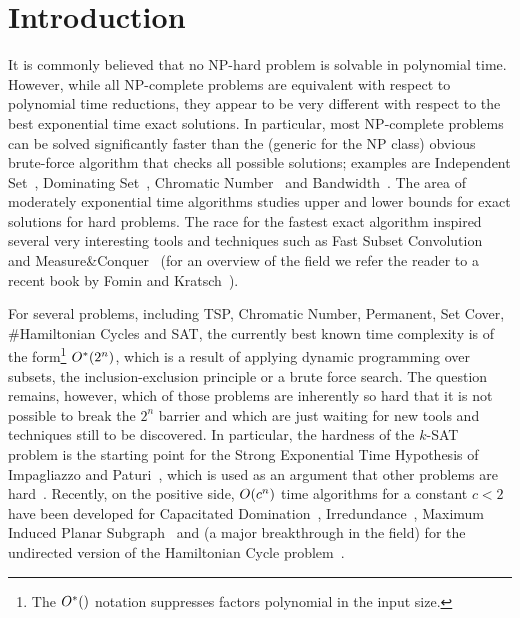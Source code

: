 \documentclass{article}
\theoremstyle{definition}
\begin{document}
\section{Introduction}

It is commonly believed that no NP-hard problem is solvable in polynomial time.
However, while all NP-complete problems are equivalent with respect to polynomial time reductions,
they appear to be very different with respect to the best exponential time exact solutions.
In particular, most NP-complete problems can be solved significantly faster than
the (generic for the NP class) obvious brute-force algorithm that checks all possible solutions;
examples are {\sc Independent Set}~\cite{fgk:m-c-jacm}, {\sc Dominating Set}~\cite{fgk:m-c-jacm,rooij:domsetesa09}, {\sc Chromatic Number}~\cite{bjohus:color} and
{\sc Bandwidth}~\cite{nasz-tcs}.
The area of moderately exponential time algorithms studies upper and lower bounds
for exact solutions for hard problems.
The race for the fastest exact algorithm inspired several very interesting tools
and techniques such as Fast Subset Convolution~\cite{bjohus:fourier} and Measure\&Conquer~\cite{fgk:m-c-jacm}
(for an overview of the field we refer the reader to a recent book by Fomin and Kratsch~\cite{fomin-book}).

For several problems, including {\sc TSP}, {\sc Chromatic Number}, {\sc Permanent},
{\sc Set Cover}, {\sc \#Hamiltonian Cycles} and {\sc SAT}, the currently best known time complexity
is of the form\footnote{The $O^\ast()$ notation suppresses factors polynomial in the input size.}
$O^\ast(2^n)$, which is a result of applying dynamic programming over subsets,
the inclusion-exclusion principle or a brute force search.
The question remains, however, which of those problems are inherently so hard that it is
not possible to break the $2^n$ barrier and which are just waiting for new tools and techniques still to be discovered.
In particular, the hardness of the $k$-{\sc SAT} problem is the starting point for the
Strong Exponential Time Hypothesis of Impagliazzo and Paturi~\cite{seth},
which is used as an argument that other problems are hard~\cite{cut-and-count,treewidth-lower,patrascu}.
Recently, on the positive side, $O(c^n)$ time algorithms for a constant $c<2$ have been developed for
{\sc Capacitated Domination}~\cite{capdomset}, {\sc Irredundance}~\cite{irrset},
{\sc Maximum Induced Planar Subgraph}~\cite{fomin-esa11} and
(a major breakthrough in the field)
for the undirected version of the {\sc Hamiltonian Cycle} problem~\cite{bjorklund-focs}.
\end{document}
